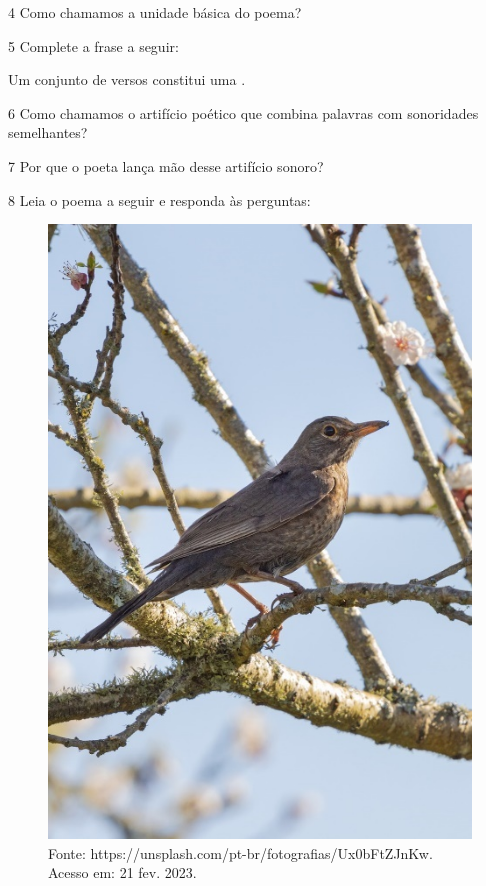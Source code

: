 \num{4} Como chamamos a unidade básica do poema?


\num{5} Complete a frase a seguir:

Um conjunto de versos constitui uma \preencher.


\num{6} Como chamamos o artifício poético que combina palavras com
sonoridades semelhantes?



\num{7} Por que o poeta lança mão desse artifício sonoro?



\num{8} Leia o poema a seguir e responda às perguntas:

\begin{figure}[htpb!]
\includegraphics[width=.5\textwidth]{./imgs/img17.jpg}
\caption{Fonte: https://unsplash.com/pt-br/fotografias/Ux0bFtZJnKw. Acesso em: 21 fev. 2023.}
\end{figure}


